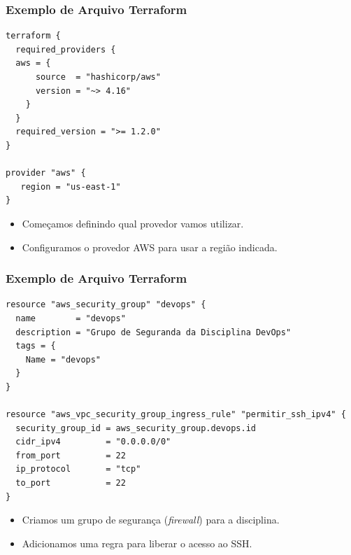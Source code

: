 \documentclass{beamer}
\begin{document}
   \begin{frame}[fragile]
      \frametitle{Exemplo de Arquivo Terraform}
      \begin{verbatim}
terraform {
  required_providers {
  aws = {
      source  = "hashicorp/aws"
      version = "~> 4.16"
    }
  }
  required_version = ">= 1.2.0"
}

provider "aws" {
   region = "us-east-1"
}
      \end{verbatim}
      \begin{itemize}
      \item Começamos definindo qual provedor vamos utilizar.
      \end{itemize}
      \begin{itemize}
      \item Configuramos o provedor AWS para usar a região indicada.
      \end{itemize}
   \end{frame}

   \begin{frame}[fragile]
      \frametitle{Exemplo de Arquivo Terraform}
      \footnotesize
      \begin{verbatim}
resource "aws_security_group" "devops" {
  name        = "devops"
  description = "Grupo de Seguranda da Disciplina DevOps"   
  tags = {
    Name = "devops"
  }
}

resource "aws_vpc_security_group_ingress_rule" "permitir_ssh_ipv4" {
  security_group_id = aws_security_group.devops.id
  cidr_ipv4         = "0.0.0.0/0"
  from_port         = 22
  ip_protocol       = "tcp"
  to_port           = 22
}
      \end{verbatim}
      \begin{itemize}
      \item Criamos um grupo de segurança (\textit{firewall}) para a disciplina.
      \end{itemize}
      \begin{itemize}
      \item Adicionamos uma regra para liberar o acesso ao SSH.
      \end{itemize}
   \end{frame}
\end{document}
